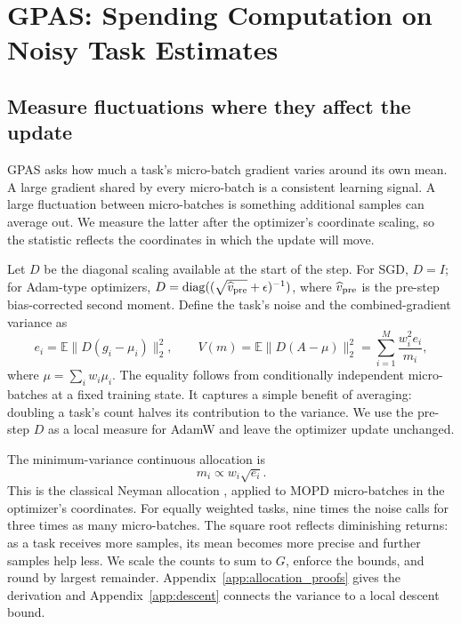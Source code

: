 \section{GPAS: Spending Computation on Noisy Task Estimates}
\label{sec:theory}

\subsection{Measure fluctuations where they affect the update}

GPAS asks how much a task's micro-batch gradient varies around its own mean.
A large gradient shared by every micro-batch is a consistent learning signal.
A large fluctuation between micro-batches is something additional samples
can average out. We measure the latter after the optimizer's coordinate
scaling, so the statistic reflects the coordinates in which the update
will move.

Let $D$ be the diagonal scaling available at the start of the step.
For SGD, $D=I$; for Adam-type optimizers,
$D=\operatorname{diag}((\sqrt{\widehat v_{\rm pre}}+\epsilon)^{-1})$,
where $\widehat v_{\rm pre}$ is the pre-step bias-corrected second moment.
Define the task's noise and the combined-gradient variance as
\begin{equation}
    e_i=\mathbb E\|D(g_i-\mu_i)\|_2^2,
    \qquad
    V(m)=\mathbb E\|D(A-\mu)\|_2^2
         =\sum_{i=1}^M\frac{w_i^2e_i}{m_i},
    \label{eq:batch_variance}
\end{equation}
where $\mu=\sum_iw_i\mu_i$. The equality follows from conditionally
independent micro-batches at a fixed training state. It captures a simple
benefit of averaging: doubling a task's count halves its contribution to
the variance. We use the pre-step $D$ as a local measure for AdamW and leave
the optimizer update unchanged.

The minimum-variance continuous allocation is
\begin{equation}
    m_i\propto w_i\sqrt{e_i}.
    \label{eq:batch_gpas_allocation}
\end{equation}
This is the classical Neyman allocation
\citep{neyman1934representative,cochran1977sampling}, applied to MOPD
micro-batches in the optimizer's coordinates. For equally weighted tasks,
nine times the noise calls for three times as many micro-batches. The square
root reflects diminishing returns: as a task receives more samples, its
mean becomes more precise and further samples help less. We scale the counts
to sum to $G$, enforce the bounds, and round by largest remainder.
Appendix~\ref{app:allocation_proofs} gives the derivation and
Appendix~\ref{app:descent} connects the variance to a local descent bound.

